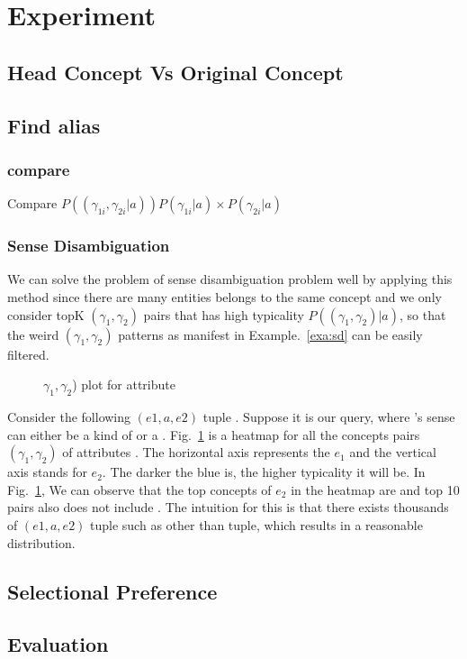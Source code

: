 \section{Experiment}

\subsection{Head Concept Vs Original Concept}

\subsection{Find alias}
\subsubsection{compare}

Compare $ P((\gamma_{1i},\gamma_{2i} |a ))P(\gamma_{1i}|a) \times P(\gamma_{2i}|a)$


\subsubsection{Sense Disambiguation}

We can solve the problem of sense disambiguation problem well by applying this method since there are many entities belongs to the same concept and we only consider topK $(\gamma_1,\gamma_2)$ pairs that has high typicality $P( (\gamma_1,\gamma_2) |a)$, so that the weird $(\gamma_1,\gamma_2)$ patterns as manifest in Example.~\ref{exa:sd} can be easily filtered.


\begin{figure}[!htb]
\centering {}
\caption{$\gamma_1,\gamma_2$) plot for attribute } \label{fig:evplot}
\end{figure}

\begin{example}
Consider the following $(e1,a,e2)$ tuple . Suppose it is our query, where 's sense can either be a kind of  or a .
Fig.~\ref{fig:evplot} is a heatmap for all the concepts pairs $(\gamma_1,\gamma_2)$ of attributes . The horizontal axis represents the $e_1$ and the vertical axis stands for $e_2$. The darker the blue is, the higher typicality it will be. In Fig.~\ref{fig:evplot}, We can observe that the top concepts of $e_2$ in the heatmap are  and top 10 pairs also does not include . The intuition for this is that there exists thousands of $(e1,a,e2)$ tuple such as  other than  tuple, which results in a reasonable distribution.
\label{exa:sd}
\end{example}


\subsection{Selectional Preference}

\subsection{Evaluation}